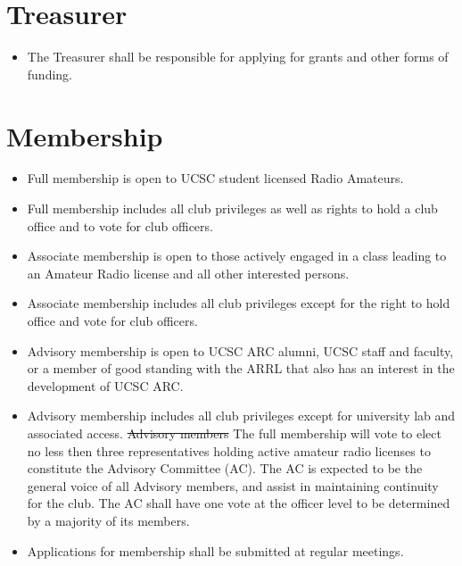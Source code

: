 \documentclass{article}
\begin{document}
{\color{blue} 
\section{Treasurer}
\begin{itemize}
\item The Treasurer shall be responsible for applying for grants and other forms of funding.
\end{itemize}
}

\section{Membership}
\begin{itemize}

\item Full membership is open to UCSC student licensed Radio Amateurs.

\item Full membership includes all club privileges as well as rights to hold a club office and to vote for club officers.

\item Associate membership is open to those actively engaged in a class leading to an Amateur Radio license and all other interested persons.

\item Associate membership includes all club privileges except for the right to hold office and vote for club officers.

\item Advisory membership is open to UCSC ARC alumni, UCSC staff and faculty, or a member of good standing with the ARRL that also has an interest in the development of UCSC ARC.

\item Advisory membership includes all club privileges except for university lab and associated access. {\color{red} \sout{Advisory members}} {\color{blue} The full membership} will vote to elect {\color{blue} no less then three} representatives holding active amateur radio licenses to constitute the Advisory Committee (AC). The AC is expected to be the general voice of all Advisory members{\color{blue}, and assist in maintaining continuity for the club}. The AC shall have one vote at the officer level to be determined by a majority of its members.

\item Applications for membership shall be submitted at regular meetings.
\end{itemize}
\end{document}
